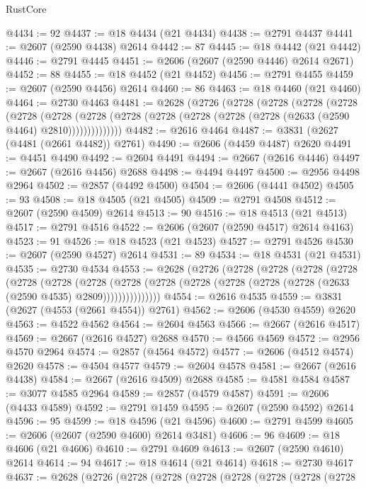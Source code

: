 \begin{lexlean}{RustCore}
\begin{coremodule}
@4434 := 92
@4437 := @18 @4434 (@21 @4434)
@4438 := @2791 @4437
@4441 := @2607 (@2590 @4438) @2614
@4442 := 87
@4445 := @18 @4442 (@21 @4442)
@4446 := @2791 @4445
@4451 := @2606 (@2607 (@2590 @4446) @2614 @2671)
@4452 := 88
@4455 := @18 @4452 (@21 @4452)
@4456 := @2791 @4455
@4459 := @2607 (@2590 @4456) @2614
@4460 := 86
@4463 := @18 @4460 (@21 @4460)
@4464 := @2730 @4463
@4481 := @2628
    (@2726
      (@2728
        (@2728
          (@2728
            (@2728
              (@2728
                (@2728
                  (@2728 (@2728 (@2728 (@2728 (@2728 (@2728 (@2633 (@2590 @4464) @2810))))))))))))))
@4482 := @2616 @4464
@4487 := @3831 (@2627 (@4481 (@2661 @4482)) @2761)
@4490 := @2606 (@4459 @4487) @2620
@4491 := @4451 @4490
@4492 := @2604 @4491
@4494 := @2667 (@2616 @4446)
@4497 := @2667 (@2616 @4456) @2688
@4498 := @4494 @4497
@4500 := @2956 @4498 @2964
@4502 := @2857 (@4492 @4500)
@4504 := @2606 (@4441 @4502)
@4505 := 93
@4508 := @18 @4505 (@21 @4505)
@4509 := @2791 @4508
@4512 := @2607 (@2590 @4509) @2614
@4513 := 90
@4516 := @18 @4513 (@21 @4513)
@4517 := @2791 @4516
@4522 := @2606 (@2607 (@2590 @4517) @2614 @4163)
@4523 := 91
@4526 := @18 @4523 (@21 @4523)
@4527 := @2791 @4526
@4530 := @2607 (@2590 @4527) @2614
@4531 := 89
@4534 := @18 @4531 (@21 @4531)
@4535 := @2730 @4534
@4553 := @2628
    (@2726
      (@2728
        (@2728
          (@2728
            (@2728
              (@2728
                (@2728
                  (@2728
                    (@2728
                      (@2728 (@2728 (@2728 (@2728 (@2728 (@2633 (@2590 @4535) @2809)))))))))))))))
@4554 := @2616 @4535
@4559 := @3831 (@2627 (@4553 (@2661 @4554)) @2761)
@4562 := @2606 (@4530 @4559) @2620
@4563 := @4522 @4562
@4564 := @2604 @4563
@4566 := @2667 (@2616 @4517)
@4569 := @2667 (@2616 @4527) @2688
@4570 := @4566 @4569
@4572 := @2956 @4570 @2964
@4574 := @2857 (@4564 @4572)
@4577 := @2606 (@4512 @4574) @2620
@4578 := @4504 @4577
@4579 := @2604 @4578
@4581 := @2667 (@2616 @4438)
@4584 := @2667 (@2616 @4509) @2688
@4585 := @4581 @4584
@4587 := @3077 @4585 @2964
@4589 := @2857 (@4579 @4587)
@4591 := @2606 (@4433 @4589)
@4592 := @2791 @1459
@4595 := @2607 (@2590 @4592) @2614
@4596 := 95
@4599 := @18 @4596 (@21 @4596)
@4600 := @2791 @4599
@4605 := @2606 (@2607 (@2590 @4600) @2614 @3481)
@4606 := 96
@4609 := @18 @4606 (@21 @4606)
@4610 := @2791 @4609
@4613 := @2607 (@2590 @4610) @2614
@4614 := 94
@4617 := @18 @4614 (@21 @4614)
@4618 := @2730 @4617
@4637 := @2628
    (@2726
      (@2728
        (@2728
          (@2728
            (@2728
              (@2728
                (@2728
                  (@2728

\end{coremodule}
\end{lexlean}
